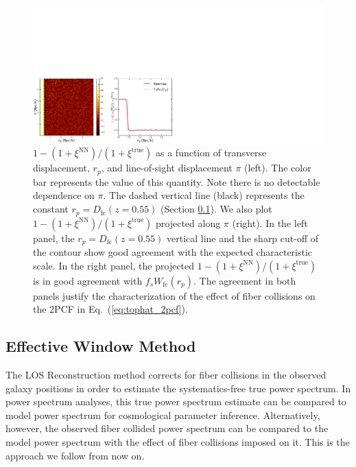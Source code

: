 \begin{figure}
\begin{center}
\includegraphics[width=1.\textwidth]{figs/fc/2pcf_Nseries_upweighted_5mocks_5x5_tophat.pdf} 
\caption{$1 - (1 + \xi^\mathrm{NN})/(1+\xi^\mathrm{true})$ as a 
function of transverse displacement, $r_p$, and line-of-sight 
displacement $\pi$ (left). The color bar represents the value of this quantity. Note there is no detectable dependence on $\pi$.
The dashed vertical line (black) represents the constant 
$r_p = D_\mathrm{fc}(z=0.55)$ (Section \ref{sec:fourier}). 
We also plot $1 - (1 + \xi^\mathrm{NN})/(1+\xi^\mathrm{true})$
projected along $\pi$ (right). In the left panel, the $r_p = D_\mathrm{fc}(z=0.55)$ 
vertical line and the sharp cut-off of the contour show good agreement with the expected characteristic scale. 
In the right panel, the projected $1 - (1 + \xi^\mathrm{NN})/(1+\xi^\mathrm{true})$
is in good agreement with $f_s W_\mathrm{fc}(r_p)$. The agreement in both panels
justify the characterization of the effect of fiber collisions on the 2PCF in 
Eq.~(\ref{eq:tophat_2pcf}).}
\label{fig:2pcf_tophat}
\end{center}
\end{figure}
\subsection{Effective Window Method} \label{sec:fourier}
The LOS Reconstruction method corrects for fiber collisions in the observed galaxy positions 
in order to estimate the systematics-free true power 
spectrum. In power spectrum analyses, this true power spectrum estimate
can be compared to model power spectrum for cosmological parameter inference. 
Alternatively, however, the observed fiber collided power spectrum can be 
compared to the model power spectrum with the effect of fiber collisions imposed 
on it. This is the approach we follow from now on.

